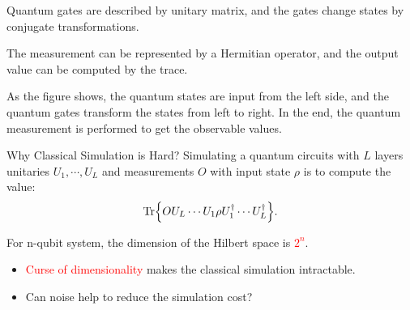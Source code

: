 \documentclass[10pt]{beamer}
\begin{document}
\begin{CJK}{UTF8}{gbsn}
{ %



 Quantum gates are described by unitary matrix, and the gates change states by conjugate transformations.

 The measurement can be represented by a Hermitian operator, and the output value can be computed by the trace.

 As the figure shows, the quantum states are input from the left side, and the quantum gates transform the states from left to right.
 In the end, the quantum measurement is performed to get the observable values.
}


\begin{frame}[fragile]{Why Classical Simulation is Hard?}
 Simulating a quantum circuits with $L$ layers  unitaries $U_1,\cdots,U_L$ and measurements $O$ with input state $\rho$ is to compute the value:
  \begin{equation}
 \Tr{O U_L\cdots U_1\rho U_1^\dagger\cdots U_L^\dagger}.
  \end{equation}
  
  
 For n-qubit system, the dimension of the Hilbert space is \textcolor{red}{$2^n$}.
  \begin{itemize}
    \item \textcolor{red}{Curse of dimensionality} makes the classical simulation intractable.
    \item Can noise help to reduce the simulation cost?
  \end{itemize}
  

\end{frame}
\end{CJK}
\end{document}

